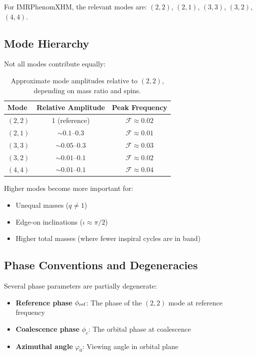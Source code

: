 \documentclass[11pt,a4paper]{article}
\newcommand{\Mf}{\mathcal{F}}
\begin{document}
For IMRPhenomXHM, the relevant modes are: $(2,2)$, $(2,1)$, $(3,3)$, $(3,2)$, $(4,4)$.

\subsection{Mode Hierarchy}

Not all modes contribute equally:

\begin{table}[h]
\centering
\begin{tabular}{lcc}
\toprule
\textbf{Mode} & \textbf{Relative Amplitude} & \textbf{Peak Frequency} \\
\midrule
$(2,2)$ & 1 (reference) & $\Mf \approx 0.02$ \\
$(2,1)$ & $\sim 0.1$--$0.3$ & $\Mf \approx 0.01$ \\
$(3,3)$ & $\sim 0.05$--$0.3$ & $\Mf \approx 0.03$ \\
$(3,2)$ & $\sim 0.01$--$0.1$ & $\Mf \approx 0.02$ \\
$(4,4)$ & $\sim 0.01$--$0.1$ & $\Mf \approx 0.04$ \\
\bottomrule
\end{tabular}
\caption{Approximate mode amplitudes relative to $(2,2)$, depending on mass ratio and spins.}
\label{tab:modes}
\end{table}

Higher modes become more important for:
\begin{itemize}
    \item Unequal masses ($q \neq 1$)
    \item Edge-on inclinations ($\iota \approx \pi/2$)
    \item Higher total masses (where fewer inspiral cycles are in band)
\end{itemize}

\subsection{Phase Conventions and Degeneracies}

Several phase parameters are partially degenerate:
\begin{itemize}
    \item \textbf{Reference phase} $\phi_{\rm ref}$: The phase of the $(2,2)$ mode at reference frequency
    \item \textbf{Coalescence phase} $\phi_c$: The orbital phase at coalescence
    \item \textbf{Azimuthal angle} $\varphi_0$: Viewing angle in orbital plane
\end{itemize}
\end{document}
